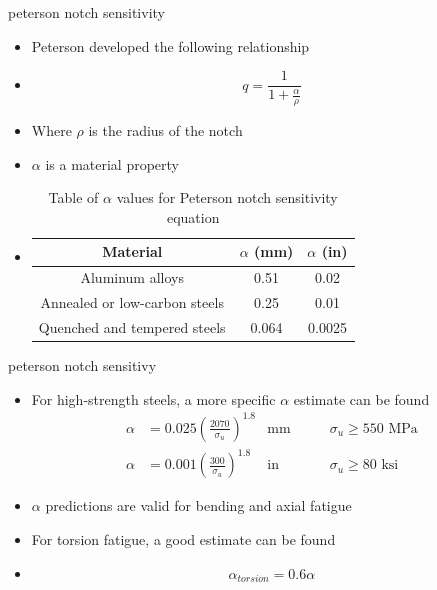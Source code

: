 \documentclass[10pt]{beamer}
\begin{document}
\begin{frame}{peterson notch sensitivity}
	\begin{itemize}[<+->]
		\item Peterson developed the following relationship
		\item[] \begin{equation}
		q = \frac{1}{1+\frac{\alpha}{\rho}}
		\end{equation}
		\item Where $\rho$ is the radius of the notch
		\item $\alpha$ is a material property
		\item[]
		\begin{table}
			\caption{Table of $\alpha$ values for Peterson notch sensitivity equation}
		\begin{tabular}{ccc}
			Material & $\alpha$ (mm) & $\alpha$ (in) \\ 
			\hline Aluminum alloys & 0.51 & 0.02 \\ 
			 Annealed or low-carbon steels & 0.25 & 0.01 \\ 
			 Quenched and tempered steels & 0.064 & 0.0025 
		\end{tabular} 
		\end{table}
	\end{itemize}
\end{frame}

\begin{frame}{peterson notch sensitivy}
	\begin{itemize}[<+->]
		\item For high-strength steels, a more specific $\alpha$ estimate can be found
		\begin{align}
		\alpha &= 0.025 \left(\frac{2070 }{\sigma_u}\right)^{1.8} & \text{mm} & \qquad \sigma_u \ge 550 \text{ MPa}\\
		\alpha &= 0.001 \left(\frac{300 }{\sigma_u}\right)^{1.8} & \text{in} & \qquad \sigma_u \ge 80 \text{ ksi}
		\end{align}
		\item $\alpha$ predictions are valid for bending and axial fatigue
		\item For torsion fatigue, a good estimate can be found
		\item[] \begin{equation}
		\alpha_{torsion} = 0.6 \alpha
		\end{equation}
	\end{itemize}
\end{frame}
\end{document}
